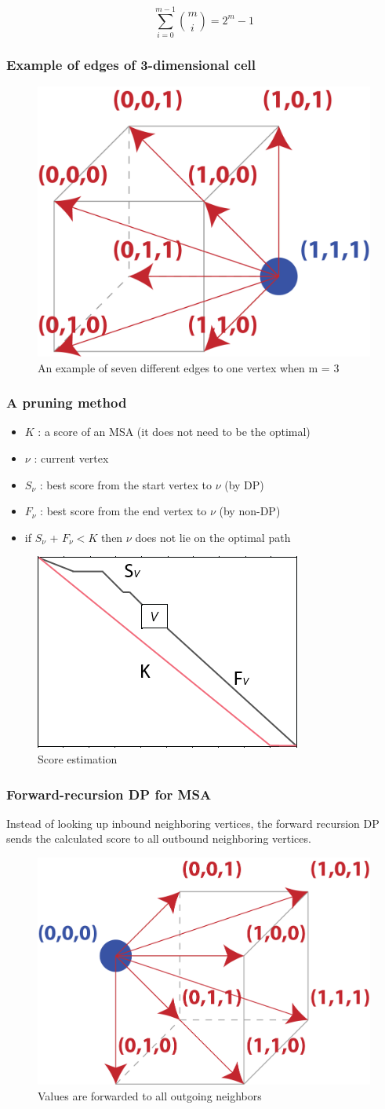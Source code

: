 \[
\sum_{i=0}^{m-1} \binom{m}{i}  = 2^m - 1
\]

%
%
\subsubsection*{Example of edges of 3-dimensional cell}
\begin{figure}[H]
  \centering
      \includegraphics[width=0.25 \textwidth]{fig08/msa_vertex_index.png}
  \caption{An example of seven different edges to one vertex when m = 3}
\end{figure}

%
%
\subsubsection*{A pruning method}
\begin{itemize}
\item $K$ : a score of an MSA (it does not need to be the optimal)
\item $\nu$ : current vertex
\item $S_{\nu}$ : best score from the start vertex to $\nu$ (by DP)
\item $F_{\nu}$ : best score from the end vertex to $\nu$ (by non-DP)
\item if $S_{\nu}$ + $F_{\nu} < K$ then $\nu$ does not lie on the optimal path
\end{itemize}

\begin{figure}[H]
  \centering
      \includegraphics[width=0.3 \textwidth]{fig08/msa_table.png}
  \caption{Score estimation}
\end{figure}

%
%
\subsubsection*{Forward-recursion DP for MSA}
Instead of looking up inbound neighboring vertices, the forward recursion DP sends the calculated score to all outbound neighboring vertices. 

\begin{figure}[H]
  \centering
      \includegraphics[width=0.3 \textwidth]{fig08/cell_update_msa_feedforward.png}
  \caption{Values are forwarded to all outgoing neighbors}
\end{figure}

\bigskip 

%
